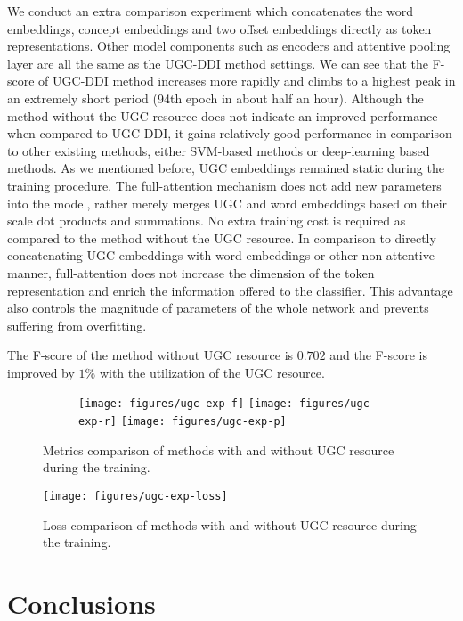 \documentclass[conference]{IEEEtran}
\begin{document}
We conduct an extra comparison experiment which concatenates the word embeddings, concept embeddings and two offset embeddings directly as token representations.
Other model components such as encoders and attentive pooling layer are all the same as the UGC-DDI method settings.
We can see that the F-score of UGC-DDI method increases more rapidly and climbs to a highest peak in an extremely short period (94th epoch in about half an hour).
Although the method without the UGC resource does not indicate an improved performance when compared to UGC-DDI,
it gains relatively good performance in comparison to other existing methods, either SVM-based methods or deep-learning based methods.
As we mentioned before, UGC embeddings remained static during the training procedure.
The full-attention mechanism does not add new parameters into the model, rather merely merges UGC and word embeddings based on their
scale dot products and summations.
No extra training cost is required as compared to the method without the UGC resource.
In comparison to directly concatenating UGC embeddings with word embeddings or other non-attentive manner,
full-attention does not increase the dimension of the token representation and enrich the information offered to the classifier.
This advantage also controls the magnitude of parameters of the whole network and prevents suffering from overfitting.

The F-score of the method without UGC resource is $0.702$ and the F-score is improved by $1\%$ with the utilization of the UGC resource.

\begin{figure*}[htb]
    \centering
    \begin{subfigure}[b]{\textwidth}
    \centering
        \texttt{[image: figures/ugc-exp-f]}%
        \texttt{[image: figures/ugc-exp-r]}
        \texttt{[image: figures/ugc-exp-p]}%
    \end{subfigure}
    \caption{Metrics comparison of methods with and without UGC resource during the training.}
    \label{fig:ugc-exp}
\end{figure*}

\begin{figure}[ht]
	\centering
	\texttt{[image: figures/ugc-exp-loss]}
	\caption{Loss comparison of methods with and without UGC resource during the training.}
	\label{fig:ugc-loss}
\end{figure}

\section{Conclusions}
\label{sec:conclusions}
\end{document}
